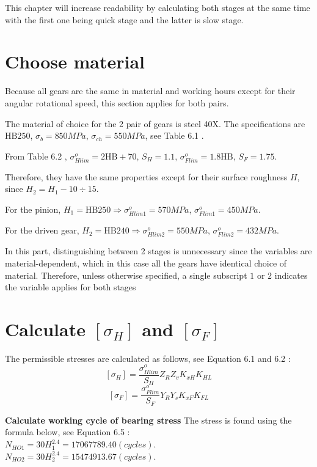 This chapter will increase readability by calculating both stages at the same time with the first one being quick stage and the latter is slow stage.
\section{Choose material}
Because all gears are the same in material and working hours except for their angular rotational speed, this section applies for both pairs.

The material of choice for the 2 pair of gears is steel 40X. The specifications are $ \text{HB} 250 $, $ \sigma_b = 850\unit{MPa} $, $ \sigma_{ch} = 550 \unit{MPa}$, see Table 6.1  \cite{tk1}.

From Table 6.2 \cite{tk1}, $ \sigma_{Hlim}^o = 2\text{HB} + 70$, $ S_H = 1.1 $, $ \sigma_{Flim}^o = 1.8\text{HB} $, $ S_F = 1.75 $.

Therefore, they have the same properties except for their surface roughness $ H $, since $ H_2 = H_1 - 10 \div 15$.

For the pinion, $ H_1=\text{HB}250 \Rightarrow \sigma_{Hlim1}^o = 570\unit{MPa}$, $ \sigma_{Flim1}^o = 450\unit{MPa}$.

For the driven gear, $ H_2=\text{HB}240 \Rightarrow \sigma_{Hlim2}^o = 550\unit{MPa}$, $ \sigma_{Flim2}^o = 432\unit{MPa}$.

In this part, distinguishing between 2 stages is unnecessary since the variables are material-dependent, which in this case all the gears have identical choice of material. Therefore, unless otherwise specified, a single subscript $ 1 $ or $ 2 $ indicates the variable applies for both stages

\section{Calculate $ [\sigma_H] $ and $ [\sigma_F] $}
The permissible stresses are calculated as follows, see Equation 6.1 and 6.2 \cite{tk1}:
\[[\sigma_{H}]=\dfrac{\sigma_{Hlim}^o}{S_H}Z_RZ_vK_{xH}K_{HL}\]
\[[\sigma_{F}]=\dfrac{\sigma_{Flim}^o}{S_F}Y_RY_sK_{xF}K_{FL}\]

\textbf{Calculate working cycle of bearing stress} The stress is found using the formula below, see Equation 6.5 \cite{tk1}:\\
$ N_{HO1} = 30H_1^{2.4} = 17067789.40\unit{(cycles)}$.\\
$ N_{HO2} = 30H_2^{2.4} = 15474913.67\unit{(cycles)}$.\\

